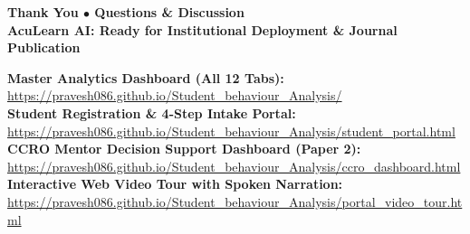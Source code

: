 \documentclass[aspectratio=169,10pt]{beamer}
\begin{document}
{
\begin{frame}
  \begin{center}
    {\color{white}\Huge\textbf{Thank You $\bullet$ Questions \& Discussion}}\\[0.25cm]
    {\color{neutralframe}\large\textbf{AcuLearn AI: Ready for Institutional Deployment \& Journal Publication}}\\[0.4cm]
    
    \begin{tcolorbox}[colframe=neutralframe,colback=cardbg,coltext=white,width=0.92\textwidth,arc=6pt]
    \centering\footnotesize
    \textbf{Master Analytics Dashboard (All 12 Tabs):}\\ \url{https://pravesh086.github.io/Student_behaviour_Analysis/}\\[0.15cm]
    \textbf{Student Registration \& 4-Step Intake Portal:}\\ \url{https://pravesh086.github.io/Student_behaviour_Analysis/student_portal.html}\\[0.15cm]
    \textbf{CCRO Mentor Decision Support Dashboard (Paper 2):}\\ \url{https://pravesh086.github.io/Student_behaviour_Analysis/ccro_dashboard.html}\\[0.15cm]
    \textbf{Interactive Web Video Tour with Spoken Narration:}\\ \url{https://pravesh086.github.io/Student_behaviour_Analysis/portal_video_tour.html}
    \end{tcolorbox}
  \end{center}
\end{frame}
}
\end{document}
